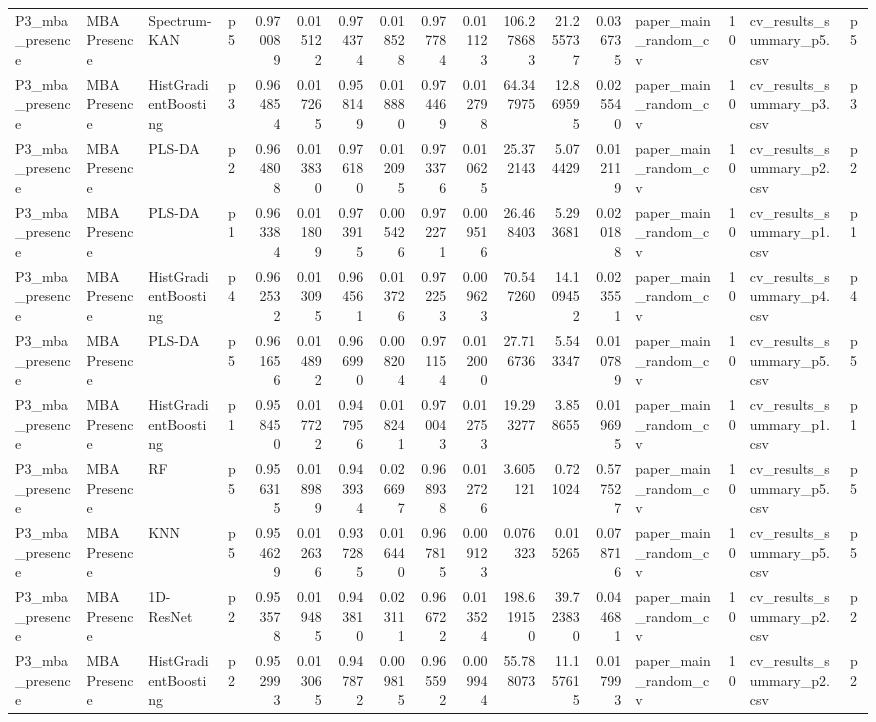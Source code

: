 \begin{tabular}{llllrrrrrrrrrlrll}
P3_mba_presence & MBA Presence & Spectrum-KAN & p5 & 0.970089 & 0.015122 & 0.974374 & 0.018528 & 0.977784 & 0.011123 & 106.278683 & 21.255737 & 0.036735 & paper_main_random_cv & 10 & cv_results_summary_p5.csv & p5 \\
P3_mba_presence & MBA Presence & HistGradientBoosting & p3 & 0.964854 & 0.017265 & 0.958149 & 0.018880 & 0.974469 & 0.012798 & 64.347975 & 12.869595 & 0.025540 & paper_main_random_cv & 10 & cv_results_summary_p3.csv & p3 \\
P3_mba_presence & MBA Presence & PLS-DA & p2 & 0.964808 & 0.013830 & 0.976180 & 0.012095 & 0.973376 & 0.010625 & 25.372143 & 5.074429 & 0.012119 & paper_main_random_cv & 10 & cv_results_summary_p2.csv & p2 \\
P3_mba_presence & MBA Presence & PLS-DA & p1 & 0.963384 & 0.011809 & 0.973915 & 0.005426 & 0.972271 & 0.009516 & 26.468403 & 5.293681 & 0.020188 & paper_main_random_cv & 10 & cv_results_summary_p1.csv & p1 \\
P3_mba_presence & MBA Presence & HistGradientBoosting & p4 & 0.962532 & 0.013095 & 0.964561 & 0.013726 & 0.972253 & 0.009623 & 70.547260 & 14.109452 & 0.023551 & paper_main_random_cv & 10 & cv_results_summary_p4.csv & p4 \\
P3_mba_presence & MBA Presence & PLS-DA & p5 & 0.961656 & 0.014892 & 0.966990 & 0.008204 & 0.971154 & 0.012000 & 27.716736 & 5.543347 & 0.010789 & paper_main_random_cv & 10 & cv_results_summary_p5.csv & p5 \\
P3_mba_presence & MBA Presence & HistGradientBoosting & p1 & 0.958450 & 0.017722 & 0.947956 & 0.018241 & 0.970043 & 0.012753 & 19.293277 & 3.858655 & 0.019695 & paper_main_random_cv & 10 & cv_results_summary_p1.csv & p1 \\
P3_mba_presence & MBA Presence & RF & p5 & 0.956315 & 0.018989 & 0.943934 & 0.026697 & 0.968938 & 0.012726 & 3.605121 & 0.721024 & 0.577527 & paper_main_random_cv & 10 & cv_results_summary_p5.csv & p5 \\
P3_mba_presence & MBA Presence & KNN & p5 & 0.954629 & 0.012636 & 0.937285 & 0.016440 & 0.967815 & 0.009123 & 0.076323 & 0.015265 & 0.078716 & paper_main_random_cv & 10 & cv_results_summary_p5.csv & p5 \\
P3_mba_presence & MBA Presence & 1D-ResNet & p2 & 0.953578 & 0.019485 & 0.943810 & 0.023111 & 0.966722 & 0.013524 & 198.619150 & 39.723830 & 0.044681 & paper_main_random_cv & 10 & cv_results_summary_p2.csv & p2 \\
P3_mba_presence & MBA Presence & HistGradientBoosting & p2 & 0.952993 & 0.013065 & 0.947872 & 0.009815 & 0.965592 & 0.009944 & 55.788073 & 11.157615 & 0.017993 & paper_main_random_cv & 10 & cv_results_summary_p2.csv & p2 \\

\end{tabular}
